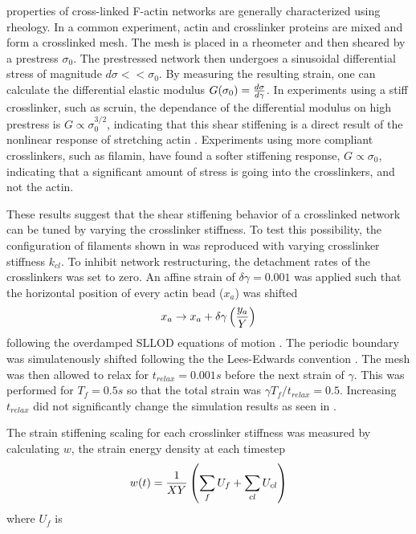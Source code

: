 \documentclass[12pt]{article} \usepackage{times} \usepackage{graphicx}
\begin{document}
  properties of cross-linked F-actin networks are generally characterized using
  rheology. In a common experiment, actin and crosslinker proteins are mixed
  and form a crosslinked mesh. The mesh is placed in a rheometer and then
  sheared by a prestress $\sigma_0$. The prestressed network then undergoes a
  sinusoidal differential stress of magnitude $d\sigma<<\sigma_0$. By measuring
  the resulting strain, one can calculate the differential elastic modulus
  $G(\sigma_0) = {d\sigma\over d\gamma}$.  In experiments using a stiff
  crosslinker, such as scruin, the dependance of the differential modulus on
  high prestress is $G\propto\sigma_0^{3/2}$, indicating that this shear
  stiffening is a direct result of the nonlinear response of stretching actin
  \cite{gardel2004,lin2010}. Experiments using more compliant crosslinkers,
  such as filamin, have found a softer stiffening response, $G\propto\sigma_0$,
  indicating that a significant amount of stress is going into the
  crosslinkers, and not the actin\cite{kasza2009}.  \par These results suggest
  that the shear stiffening behavior of a crosslinked network can be tuned by
  varying the crosslinker stiffness. To test this possibility, the
  configuration of filaments shown in  was reproduced with varying
  crosslinker stiffness $k_{cl}$.  To inhibit network restructuring, the
  detachment rates of the crosslinkers was set to zero.  An affine strain of
  $\delta\gamma=0.001$ was applied such that the horizontal position of every
  actin bead ($x_a$) was shifted \begin{equation} x_a \rightarrow x_a +
    \delta\gamma \left( {y_a\over Y} \right) \label{eqn:sllod} \end{equation}
  following the overdamped SLLOD equations of motion \cite{evans1984}. The
  periodic boundary was simulatenously shifted following the the Lees-Edwards
  convention \cite{allen}. The mesh was then allowed to relax for $t_{relax} =
  0.001 s$ before the next strain of $\gamma$. This was performed for
  $T_f=0.5s$ so that the total strain was $\gamma T_f/t_{relax}=0.5$.
  Increasing $t_{relax}$ did not significantly change the simulation results as
  seen in .  \par The strain stiffening scaling for each
  crosslinker stiffness was measured by calculating $w$, the strain energy
  density at each timestep \begin{equation} w(t) = {1\over X Y}\left(\sum_f{
    U_f}+\sum_{cl}{U_{cl}}\right) \label{eqn:sed} \end{equation} where $U_f$ is
\end{document}
